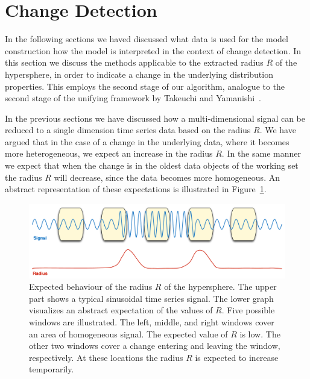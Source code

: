 \section{Change Detection}\label{sec:method_change_detection}
In the following sections we haved discussed what data is used for the model construction how the model is interpreted in the context of change detection.
In this section we discuss the methods applicable to the extracted radius $R$ of the hypersphere, in order to indicate a change in the underlying distribution properties.
This employs the second stage of our algorithm, analogue to the second stage of the unifying framework by Takeuchi and Yamanishi~\cite{takeuchi2006unifying}.

In the previous sections we have discussed how a multi-dimensional signal can be reduced to a single dimension time series data based on the radius $R$.
We have argued that in the case of a change in the underlying data, where it becomes more heterogeneous, we expect an increase in the radius $R$.
In the same manner we expect that when the change is in the oldest data objects of the working set the radius $R$ will decrease, since the data becomes more homogeneous.
An abstract representation of these expectations is illustrated in Figure~\ref{fig:radius_expectation}.

\begin{figure}
  \centering
    \includegraphics[width=\textwidth,height=\textheight,keepaspectratio]{./Figures/chapter4/expected_behaviour.pdf}
  \caption[Expected radius behaviour]{Expected behaviour of the radius $R$ of the hypersphere. The upper part shows a typical sinusoidal time series signal. The lower graph visualizes an abstract expectation of the values of $R$. Five possible windows are illustrated. The left, middle, and right windows cover an area of homogeneous signal. The expected value of $R$ is low. The other two windows cover a change entering and leaving the window, respectively. At these locations the radius $R$ is expected to increase temporarily. }
  \label{fig:radius_expectation}
\end{figure}

